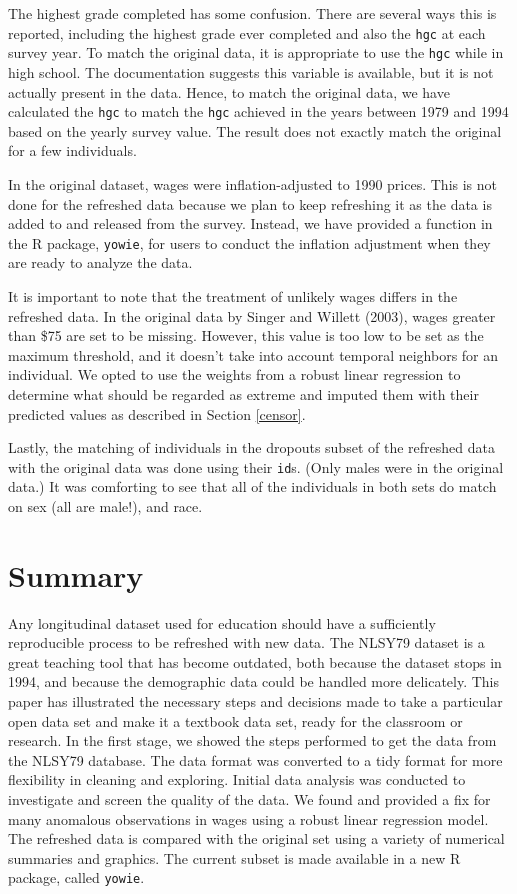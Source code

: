 \documentclass[12pt]{article}
\begin{document}
The highest grade completed has some confusion. There are several ways this is reported, including the highest grade ever completed and also the \texttt{hgc} at each survey year. To match the original data, it is appropriate to use the \texttt{hgc} while in high school. The documentation suggests this variable is available, but it is not actually present in the data. Hence, to match the original data, we have calculated the \texttt{hgc} to match the \texttt{hgc} achieved in the years between 1979 and 1994 based on the yearly survey value. The result does not exactly match the original for a few individuals.

In the original dataset, wages were inflation-adjusted to 1990 prices. This is not done for the refreshed data because we plan to keep refreshing it as the data is added to and released from the survey. Instead, we have provided a function in the R package, \texttt{yowie}, for users to conduct the inflation adjustment when they are ready to analyze the data.

It is important to note that the treatment of unlikely wages differs in the refreshed data. In the original data by Singer and Willett (2003), wages greater than \$75 are set to be missing. However, this value is too low to be set as the maximum threshold, and it doesn't take into account temporal neighbors for an individual. We opted to use the weights from a robust linear regression to determine what should be regarded as extreme and imputed them with their predicted values as described in Section \ref{censor}.

Lastly, the matching of individuals in the dropouts subset of the refreshed data with the original data was done using their \texttt{id}s. (Only males were in the original data.) It was comforting to see that all of the individuals in both sets do match on sex (all are male!), and race.

\hypertarget{summary}{%
\section{Summary}\label{summary}}

Any longitudinal dataset used for education should have a sufficiently reproducible process to be refreshed with new data. The NLSY79 dataset is a great teaching tool that has become outdated, both because the dataset stops in 1994, and because the demographic data could be handled more delicately. This paper has illustrated the necessary steps and decisions made to take a particular open data set and make it a textbook data set, ready for the classroom or research. In the first stage, we showed the steps performed to get the data from the NLSY79 database. The data format was converted to a tidy format for more flexibility in cleaning and exploring. Initial data analysis was conducted to investigate and screen the quality of the data. We found and provided a fix for many anomalous observations in wages using a robust linear regression model. The refreshed data is compared with the original set using a variety of numerical summaries and graphics. The current subset is made available in a new R package, called \texttt{yowie}.
\end{document}
